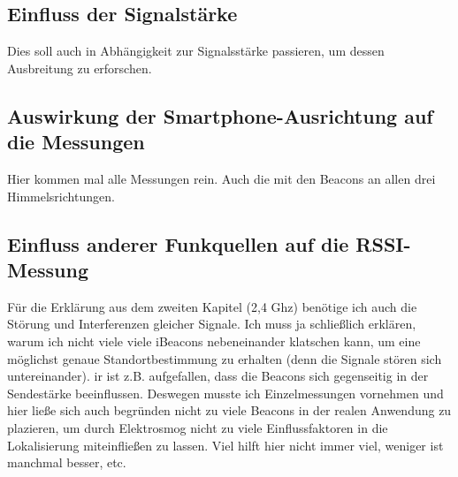 \subsection{Einfluss der Signalstärke} 
Dies soll auch in Abhängigkeit zur Signalsstärke passieren, um dessen Ausbreitung zu erforschen.
\subsection{Auswirkung der Smartphone-Ausrichtung auf die Messungen}
Hier kommen mal alle Messungen rein. Auch die mit den Beacons an allen drei Himmelsrichtungen.
\subsection{Einfluss anderer Funkquellen auf die RSSI-Messung} 
Für die Erklärung aus dem zweiten Kapitel (2,4 Ghz) benötige ich auch die Störung und Interferenzen gleicher Signale. Ich muss ja schließlich erklären, warum ich nicht viele viele iBeacons nebeneinander klatschen kann, um eine möglichst genaue Standortbestimmung zu erhalten (denn die Signale stören sich untereinander). 
ir ist z.B. aufgefallen, dass die Beacons sich gegenseitig in der Sendestärke beeinflussen. Deswegen musste ich Einzelmessungen vornehmen und hier ließe sich auch begründen nicht zu viele Beacons in der realen Anwendung zu plazieren, um durch Elektrosmog nicht zu viele Einflussfaktoren in die Lokalisierung miteinfließen zu lassen. Viel hilft hier nicht immer viel, weniger ist manchmal besser, etc.